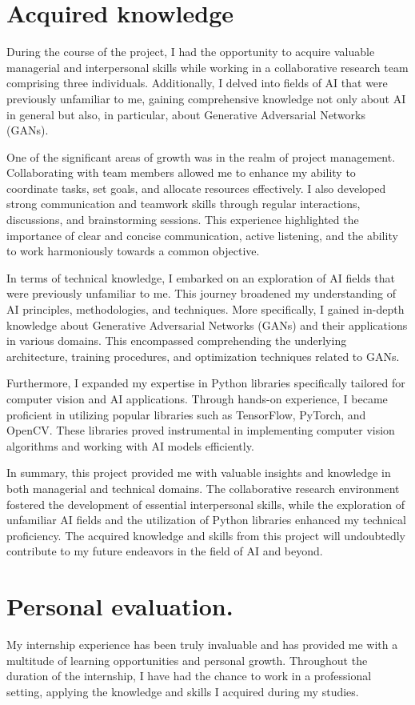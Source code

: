 \section{Acquired knowledge}
During the course of the project, I had the opportunity to acquire valuable managerial and interpersonal skills while working in a collaborative research team comprising three individuals. 
Additionally, I delved into fields of AI that were previously unfamiliar to me, gaining comprehensive knowledge not only about AI in general but also, in particular, about Generative Adversarial Networks (GANs).

One of the significant areas of growth was in the realm of project management. Collaborating with team members allowed me to enhance my ability to coordinate tasks, set goals, and allocate resources effectively. 
I also developed strong communication and teamwork skills through regular interactions, discussions, and brainstorming sessions. 
This experience highlighted the importance of clear and concise communication, active listening, and the ability to work harmoniously towards a common objective.

In terms of technical knowledge, I embarked on an exploration of AI fields that were previously unfamiliar to me. 
This journey broadened my understanding of AI principles, methodologies, and techniques. 
More specifically, I gained in-depth knowledge about Generative Adversarial Networks (GANs) and their applications in various domains. 
This encompassed comprehending the underlying architecture, training procedures, and optimization techniques related to GANs.

Furthermore, I expanded my expertise in Python libraries specifically tailored for computer vision and AI applications. 
Through hands-on experience, I became proficient in utilizing popular libraries such as TensorFlow, PyTorch, and OpenCV.\@
These libraries proved instrumental in implementing computer vision algorithms and working with AI models efficiently.

In summary, this project provided me with valuable insights and knowledge in both managerial and technical domains. 
The collaborative research environment fostered the development of essential interpersonal skills, while the exploration of unfamiliar AI fields and the utilization of Python libraries enhanced my technical proficiency. 
The acquired knowledge and skills from this project will undoubtedly contribute to my future endeavors in the field of AI and beyond.
\section{Personal evaluation.}
My internship experience has been truly invaluable and has provided me with a multitude of learning opportunities and personal growth. 
Throughout the duration of the internship, I have had the chance to work in a professional setting, applying the knowledge and skills I acquired during my studies.

